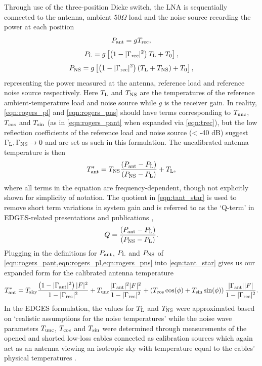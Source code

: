 Through use of the three-position Dicke switch, the LNA is sequentially connected to the antenna, ambient $50\Omega$ load and the noise source recording the power at each position
\begin{equation}
    P_{\mathrm{ant}} = g T_{\mathrm{rec}},
    \label{eqn:rogers_pant}
\end{equation}
\begin{equation}
    P_{\mathrm{L}} = g \left[  \left( 1 - |\Gamma_{\mathrm{rec}}|^2 \right) T_{\mathrm{L}} + T_0 \right],
    \label{eqn:rogers_pl}
\end{equation}
\begin{equation}
    P_{\mathrm{NS}} = g \left[ \left( 1 - |\Gamma_{\mathrm{rec}}|^2 \right) \left( T_{\mathrm{L}} + T_{\mathrm{NS}} \right) + T_0 \right],
    \label{eqn:rogers_pns}
\end{equation}
representing the power measured at the antenna, reference load and reference noise source respectively. Here $T_{\mathrm{L}}$ and $T_{\mathrm{NS}}$ are the temperatures of the reference ambient-temperature load and noise source while $g$ is the receiver gain. In reality, \cref{eqn:rogers_pl} and \cref{eqn:rogers_pns} should have terms corresponding to $T_{\mathrm{unc}}$, $T_{\mathrm{cos}}$ and $T_{\mathrm{\sin}}$ (as in \cref{eqn:rogers_pant} when expanded via \cref{eqn:trec}), but the low reflection coefficients of the reference load and noise source (< -40 dB) suggest $\Gamma_{\mathrm{L}},\Gamma_{\mathrm{NS}}\rightarrow0$ and are set as such in this formulation. The uncalibrated antenna temperature is then
\begin{equation}
    T_{\mathrm{ant}}^* = T_{\mathrm{NS}} \frac{\left( P_{\mathrm{ant}} - P_{\mathrm{L}} \right)}{\left( P_{\mathrm{NS}} - P_{\mathrm{L}} \right)} + T_{\mathrm{L}},
    \label{eqn:tant_star}
\end{equation}
where all terms in the equation are frequency-dependent, though not explicitly shown for simplicity of notation. The quotient in \cref{eqn:tant_star} is used to remove short term variations in system gain and is referred to as the ‘Q-term’ in EDGES-related presentations and publications \citep{murray_calpap},
\begin{equation}
    Q =  \frac{\left( P_{\mathrm{ant}} - P_{\mathrm{L}} \right)}{\left( P_{\mathrm{NS}} - P_{\mathrm{L}} \right)}.
    \label{eqn:qterm}
\end{equation}
Plugging in the definitions for $P_{\mathrm{ant}}$, $P_{\mathrm{L}}$ and $P_{\mathrm{NS}}$ of \cref{eqn:rogers_pant,eqn:rogers_pl,eqn:rogers_pns} into \cref{eqn:tant_star} gives us our expanded form for the calibrated antenna temperature
\begin{equation}
    T_{\mathrm{ant}}^* = T_{\mathrm{sky}}\frac{\left(1 - |\Gamma_{\mathrm{ant}}|^2\right)|F|^2}{1 - |\Gamma_{\mathrm{rec}}|^2} + T_{\mathrm{unc}}\frac{|\Gamma_{\mathrm{ant}}|^2|F|^2}{1 - |\Gamma_{\mathrm{rec}}|^2} + \left( T_{\mathrm{cos}}\cos(\phi) + T_{\mathrm{sin}}\sin(\phi) \right)\frac{|\Gamma_{\mathrm{ant}}||F|}{1 - |\Gamma_{\mathrm{rec}}|^2}.
    \label{eqn:rogers_calibrated_temp}
\end{equation}
In the EDGES formulation, the values for $T_{\mathrm{L}}$ and $T_{\mathrm{NS}}$ were approximated based on ‘realistic assumptions for the noise temperatures’ \citep{edgesCal} while the noise wave parameters $T_{\mathrm{unc}}$, $T_{\mathrm{cos}}$ and $T_{\mathrm{sin}}$ were determined through measurements of the opened and shorted low-loss cables connected as calibration sources which again act as an antenna viewing an isotropic sky with temperature equal to the cables’ physical temperatures \citep{rogersCal}.

